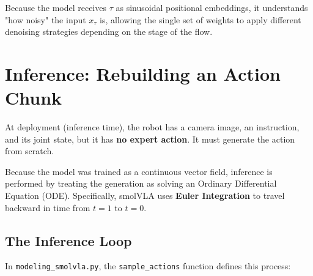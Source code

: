 \documentclass[11pt,a4paper]{article}
\begin{document}
Because the model receives $\tau$ as sinusoidal positional embeddings, it understands "how noisy" the input $x_\tau$ is, allowing the single set of weights to apply different denoising strategies depending on the stage of the flow.

\section{Inference: Rebuilding an Action Chunk}
At deployment (inference time), the robot has a camera image, an instruction, and its joint state, but it has \textbf{no expert action}. It must generate the action from scratch.

Because the model was trained as a continuous vector field, inference is performed by treating the generation as solving an Ordinary Differential Equation (ODE). Specifically, smolVLA uses \textbf{Euler Integration} to travel backward in time from $t=1$ to $t=0$.

\subsection{The Inference Loop}
In \texttt{modeling\_smolvla.py}, the \texttt{sample\_actions} function defines this process:
\end{document}
